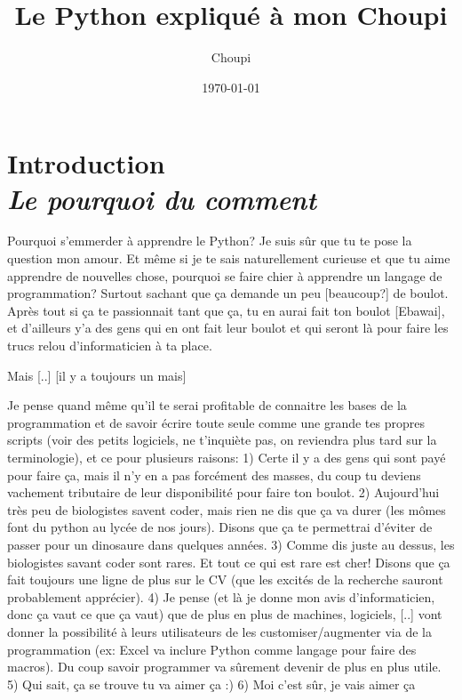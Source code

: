 \documentclass[a4paper, 11pt, oneside, draft]{book}
\title{Le Python expliqu\'e \`a mon Choupi}
\author{Choupi}
\date{\today}
\newcommand\Chapter[2]{
	\chapter[#1]{#1\\[2ex]\Large\itshape#2}
}
\begin{document}
\maketitle

\frontmatter
\Chapter{Introduction}{Le pourquoi du comment}
Pourquoi s'emmerder \`a apprendre le Python? Je suis s\^ur que tu te pose la question mon amour.
Et m\^eme si je te sais naturellement curieuse et que tu aime apprendre de nouvelles chose, pourquoi se faire chier \`a apprendre un langage de programmation?
Surtout sachant que \c ca demande un peu [beaucoup?] de boulot. Apr\`es tout si \c ca te passionnait tant que \c ca, tu en aurai fait ton boulot [Ebawai], et d'ailleurs y'a des gens qui en ont fait leur boulot et qui seront l\`a pour faire les trucs relou d'informaticien \`a ta place.

Mais [..] [il y a toujours un mais]

Je pense quand m\^eme qu'il te serai profitable de connaitre les bases de la programmation et de savoir
\'ecrire toute seule comme une grande tes propres scripts (voir des petits logiciels, ne t'inqui\`ete pas,
on reviendra plus tard sur la terminologie), et ce pour plusieurs raisons:
    1) Certe il y a des gens qui sont pay\'e pour faire \c ca, mais il n'y en a pas forc\'ement des masses, du
coup tu deviens vachement tributaire de leur disponibilit\'e pour faire ton boulot.
    2) Aujourd'hui tr\`es peu de biologistes savent coder, mais rien ne dis que \c ca va durer (les mômes font
du python au lyc\'ee de nos jours). Disons que \c ca te permettrai d'\'eviter de passer pour un dinosaure dans
quelques ann\'ees.
    3) Comme dis juste au dessus, les biologistes savant coder sont rares. Et tout ce qui est rare est cher!
Disons que \c ca fait toujours une ligne de plus sur le CV (que les excit\'es de la recherche sauront probablement
appr\'ecier).
    4) Je pense (et l\`a je donne mon avis d'informaticien, donc \c ca vaut ce que \c ca vaut) que de plus en plus de
machines, logiciels, [..] vont donner la possibilit\'e \`a leurs utilisateurs de les customiser/augmenter via de la
programmation (ex: Excel va inclure Python comme langage pour faire des macros). Du coup savoir programmer va
sûrement devenir de plus en plus utile.
    5) Qui sait, \c ca se trouve tu va aimer \c ca :)
    6) Moi c'est sûr, je vais aimer \c ca
\end{document}
